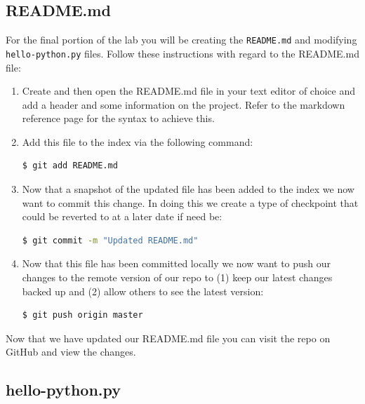 \documentclass[a4paper,10pt]{article} %
\begin{document}
\subsection{README.md}

For the final portion of the lab you will be creating the \lstinline|README.md| and modifying \lstinline|hello-python.py| files. Follow these instructions with regard to the README.md file:
\begin{enumerate}
  \item Create and then open the README.md file in your text editor of choice and add a header and some information on the project. Refer to the markdown reference page for the syntax to achieve this.
  \item Add this file to the index via the following command:
\begin{lstlisting}[language=bash]
$ git add README.md
\end{lstlisting}
  \item Now that a snapshot of the updated file has been added to the index we now want to commit this change. In doing this we create a type of checkpoint that could be reverted to at a later date if need be:
\begin{lstlisting}[language=bash]
$ git commit -m "Updated README.md"
\end{lstlisting}
\item Now that this file has been committed locally we now want to push our changes to the remote version of our repo to (1) keep our latest changes backed up and (2) allow others to see the latest version:
\begin{lstlisting}[language=bash]
$ git push origin master
\end{lstlisting}
\end{enumerate}

Now that we have updated our README.md file you can visit the repo on GitHub and view the changes.

\subsection{hello-python.py}
\end{document}
